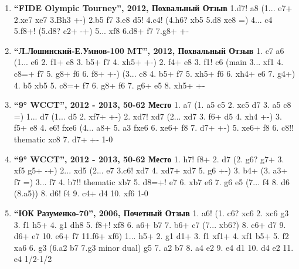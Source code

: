\begin{enumerate}
\item \textbf{ ``FIDE Olympic Tourney'', 2012, Похвальный Отзыв } 1.d7! \queen{}a8 
  (1... \queen{}e7+ 2.\rook{}xe7 \king{}xe7 3.Bh3 +-) 
2.\bishop{}b5 \king{}f7 3.\rook{}e8 \queen{}d5! 4.\bishop{}c4! 
  (4.\king{}h6? \queen{}xb5 5.d8\queen{} \queen{}xe8 =)
4... \queen{}c4 5.\rook{}f8+! 
  (5.d8\queen{}? \queen{}c2+ -+) 
5... \king{}xf8 6.d8\queen{}+ \king{}f7 7.\queen{}g8+ +-

\item \textbf{ ``Л.Лошинский-Е.Умнов-100 MT'', 2012, Похвальный Отзыв } 1. c7 \queen{}a6 
  (1... \queen{}e6 2. \queen{}f1+ \king{}e8 3. \queen{}b5+ \king{}f7 4. \queen{}xh5+ +-) 
2. \queen{}f4+ \king{}e8 3. \queen{}f1! \queen{}c6 
  ({main} 3... \queen{}xf1 4. c8=\queen{}+ \king{}f7 5. \queen{}g8+ \king{}f6 6. \queen{}f8+ +-) 
  (3... \queen{}c8 4. \queen{}b5+ \king{}f7 5. \queen{}xh5+ \king{}f6 6. \queen{}xh4+ \king{}e6 7. \queen{}g4+) 
4. \queen{}b5 \queen{}xb5 5. c8=\queen{}+ \king{}f7 6. \queen{}g8+ \king{}f6 7. \queen{}g6+ \king{}e5 8. \queen{}xh5+ +-

\item \textbf{ ``9° WCCT'', 2012 - 2013, 50-62 Место } 1. \rook{}a7 
  (1. \rook{}a5 c5 2. \rook{}xc5 \knight{}d7 3. \rook{}a5 \queen{}c8 =) 
1... \knight{}d7 
  (1... \king{}d5 2. \queen{}xf7+ +-)
2. \rook{}xd7! \king{}xd7 
  (2... \queen{}xd7 3. \queen{}f6+ \king{}d5 4. \queen{}xh4 +-) 
3. \queen{}f5+ \king{}e8 4. e6! fxe6 
  (4... \queen{}a8+ 5. \bishop{}a3 fxe6 6. \queen{}xe6+ \king{}f8 7. d7+ +-) 
5. \queen{}xe6+ \king{}f8 6. \queen{}c8!! {thematic} \queen{}xc8 7. d7+ +- 1-0

\item \textbf{ ``9° WCCT'', 2012 - 2013, 50-62 Место } 1. \king{}h7! \king{}f8+ 2. d7 
  (2. \king{}g6? \queen{}g7+ 3. \king{}xf5 \queen{}g5+ -+) 
2... \queen{}xd5 
  (2... \king{}e7 3.\queen{}c6! \queen{}xd7 4. \queen{}xd7+ \king{}xd7 5. \king{}g6 +-) 
3. \queen{}b4+ 
  (3. \queen{}a3+ \king{}f7 =) 
3... \king{}f7 4. \queen{}b7!! {thematic} \queen{}xb7 5. d8=\knight{}+! \king{}e7 6. \knight{}xb7 \king{}e6 7. \king{}g6 \king{}e5 
  (7... f4 8. \knight{}d6 (8.\knight{}a5)) 
8. \knight{}d6! f4 9. \knight{}c4+ \king{}d4 10. \king{}xf6 1-0

\item \textbf{ ``ЮК Разуменко-70'', 2006, Почетный Отзыв } 1. \knight{}a6! 
  (1. \knight{}c6? \bishop{}xc6 2. \rook{}xc6 g3 3. \rook{}f1 \rook{}h5+ 4. \king{}g1 \rook{}dh8 5. \rook{}f8+! \rook{}xf8 6.
\rook{}a6+ \king{}b7 7. \rook{}b6+ \king{}c7 (7... \king{}xb6?) 8. \rook{}c6+ \king{}d7 9. \rook{}d6+ \king{}e7 10. \rook{}e6+ \king{}f7 11.\rook{}f6+ \king{}xf6) 
1... \rook{}h5+ 2. \king{}g1 \rook{}d1+ 3. \rook{}f1 \rook{}xf1+ 4. \king{}xf1 \bishop{}b5+ 5. \king{}f2 \bishop{}xa6 6. \king{}g3 
 (6.\rook{}a2 \king{}b7 7.\king{}g3 minor dual)
\rook{}g5 7. \rook{}a2 \king{}b7 8. \rook{}a4 \bishop{}e2 9. \rook{}e4 \bishop{}d1 10. \rook{}d4 \bishop{}e2 11. \rook{}e4 1/2-1/2


\end{enumerate}

